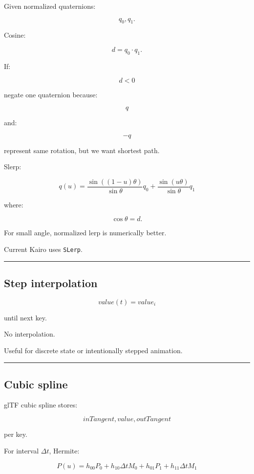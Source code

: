 Given normalized quaternions:

\[
q_0,q_1.
\]

Cosine:

\[
d=q_0\cdot q_1.
\]

If:

\[
d<0
\]

negate one quaternion because:

\[
q
\]

and:

\[
-q
\]

represent same rotation, but we want shortest path.

Slerp:

\[
\boxed{
q(u)
=
\frac{
\sin((1-u)\theta)
}{
\sin\theta
}
q_0
+
\frac{
\sin(u\theta)
}{
\sin\theta
}
q_1
}
\]

where:

\[
\cos\theta=d.
\]

For small angle, normalized lerp is numerically better.

Current Kairo uses \texttt{SLerp}.

\begin{center}\rule{0.5\linewidth}{0.5pt}\end{center}

\subsection{Step interpolation}\label{04-visual-computing-ii-ch041-step-interpolation}

\[
value(t)=value_i
\]

until next key.

No interpolation.

Useful for discrete state or intentionally stepped animation.

\begin{center}\rule{0.5\linewidth}{0.5pt}\end{center}

\subsection{Cubic spline}\label{04-visual-computing-ii-ch041-cubic-spline}

glTF cubic spline stores:

\[
inTangent,
value,
outTangent
\]

per key.

For interval \(\Delta t\), Hermite:

\[
P(u)
=
h_{00}P_0
+
h_{10}\Delta t M_0
+
h_{01}P_1
+
h_{11}\Delta t M_1
\]

